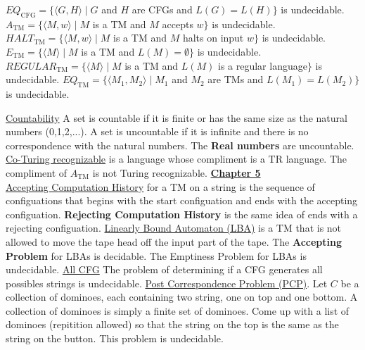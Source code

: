 \documentclass[9pt]{article}
\begin{document}
\begin{minipage}[t]{.48\textwidth}
    $EQ_{\text{CFG}}=\{\langle G,H\rangle\mid G$ and $H$ are CFGs and $L(G)=L(H)\}$ is undecidable.\newline
    $A_{\text{TM}}=\{\langle M, w\rangle\mid M$ is a TM and $M$ accepts $w\}$ is undecidable.\newline
    $HALT_{\text{TM}}=\{\langle M,w\rangle\mid M$ is a TM and $M$ halts on input $w\}$ is undecidable.\newline
    $E_{\text{TM}}=\{\langle M\rangle\mid M$ is a TM and $L(M)=\emptyset\}$ is undecidable.\newline
    $REGULAR_{\text{TM}}=\{\langle M\rangle\mid M$ is a TM and $L(M)$ is a regular language$\}$ is undecidable.\newline
    $EQ_{\text{TM}}=\{\langle M_1,M_2\rangle\mid M_1$ and $M_2$ are TMs and $L(M_1) = L(M_2)\}$ is undecidable.
\end{minipage}
\uline{Countability}\newline
A set is countable if it is finite or has the same size as the natural numbers (0,1,2,...). A set is uncountable if it is infinite and there is no correspondence with the natural numbers. The \textbf{Real numbers} are uncountable.\newline
\uline{Co-Turing recognizable} is a language whose compliment is a TR language. The compliment of $A_{\text{TM}}$ is not Turing recognizable.\newline
\uline{\textbf{Chapter 5}}\\
\uline{Accepting Computation History} for a TM on a string is the sequence of configuations that begins with the start configuation and ends with the accepting configuation. \textbf{Rejecting Computation History} is the same idea of ends with a rejecting configuation.\newline
\uline{Linearly Bound Automaton (LBA)} is a TM that is not allowed to move the tape head off the input part of the tape. The \textbf{Accepting Problem} for LBAs is decidable. The Emptiness Problem for LBAs is undecidable.\newline
\uline{All CFG} The problem of determining if a CFG generates all possibles strings is undecidable.\newline
\uline{Post Correspondence Problem (PCP)}. Let $C$ be a collection of dominoes, each containing two string, one on top and one bottom. A collection of dominoes is simply a finite set of dominoes. Come up with a list of dominoes (repitition allowed) so that the string on the top is the same as the string on the button. This problem is undecidable.\newline
\end{document}
